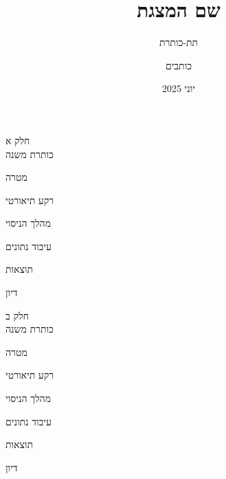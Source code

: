 \documentclass{beamer}
\title[שם המצגת]{שם המצגת}
\subtitle{תת-כותרת}
\author[כותבים]{כותבים}
\date[יוני 2025]{יוני 2025}
\begin{document}
\frame{\titlepage}



\begin{frame}
    \centering
    \vfill
    {\LARGE חלק א} \\[1ex]
    {\large כותרת משנה}
    \vfill
\end{frame}


\begin{frame}{מטרה}

\end{frame}


\begin{frame}{רקע תיאורטי}

\end{frame}


\begin{frame}{מהלך הניסוי}

\end{frame}


\begin{frame}{עיבוד נתונים}

\end{frame}


\begin{frame}{תוצאות}

\end{frame}


\begin{frame}{דיון}

\end{frame}

\begin{frame}
    \centering
    \vfill
    {\LARGE חלק ב} \\[1ex]
    {\large כותרת משנה}
    \vfill
\end{frame}

\begin{frame}{מטרה}

\end{frame}


\begin{frame}{רקע תיאורטי}

\end{frame}


\begin{frame}{מהלך הניסוי}

\end{frame}


\begin{frame}{עיבוד נתונים}

\end{frame}


\begin{frame}{תוצאות}

\end{frame}


\begin{frame}{דיון}

\end{frame}
\end{document}
